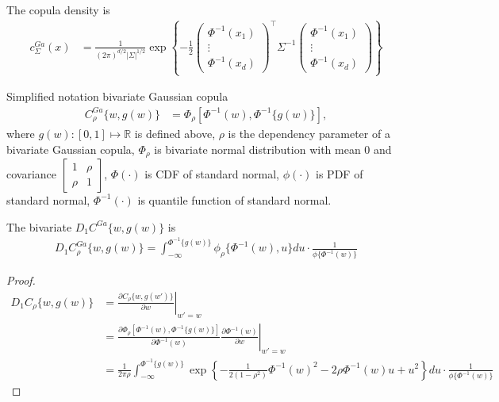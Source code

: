 The copula density is
\begin{align}
    c^{Ga}_\Sigma(x) &= \frac{1}{(2\pi)^{d/2} |\Sigma|^{1/2}}
    \exp \left\{
    -\frac{1}{2}\begin{pmatrix} \Phi^{-1}(x_1) \\ \vdots \\ \Phi^{-1}(x_d) \end{pmatrix}^\top \Sigma^{-1} \begin{pmatrix} \Phi^{-1}(x_1) \\ \vdots \\ \Phi^{-1}(x_d) \end{pmatrix}
    \right\}
    \end{align}

Simplified notation bivariate Gaussian copula
\begin{align}
       C^{Ga}_\rho \{w, g(w)\} &= \Phi_\rho [\Phi^{-1}(w), \Phi^{-1}\{g(w)\}],
\end{align}
where $g(w): [0,1] \mapsto \mathbb{R}$ is defined above,
$\rho$ is the dependency parameter of a bivariate Gaussian copula,
$\Phi_\rho$ is bivariate normal distribution with mean 0 and covariance $\begin{bmatrix}1 & \rho \\ \rho & 1 \end{bmatrix}$,
$\Phi(\cdot)$ is CDF of standard normal,
$\phi(\cdot)$ is PDF of standard normal,
$\Phi^{-1}(\cdot)$ is quantile function of standard normal.


The bivariate $D_1 C^{Ga}\{w, g(w)\}$ is
\begin{align}
    D_1 C^{Ga}_\rho\{w, g(w)\} = \int_{-\infty}^{\Phi^{-1}\{g(w)\}} \phi_\rho\{
    \Phi^{-1}(w), u \}du \cdot \frac{1}{\phi\{\Phi^{-1}(w)\}}
    \end{align}
\begin{proof}
    \begin{align}
    D_1 C_\rho\{w, g(w)\}
    &= \left. \frac{\partial C_\rho\{w, g(w')\}}{\partial w}\right|_{w'=w}\\
    &= \left. \frac{\partial \Phi_\rho [\Phi^{-1}(w), \Phi^{-1}\{g(w)\}]}{\partial \Phi^{-1}(w)} \frac{\partial \Phi^{-1}(w)}{\partial w}\right|_{w'=w}\\
    &= \frac{1}{2\pi\rho} \int_{-\infty}^{\Phi^{-1}\{g(w)\}} \exp\left\{
        -\frac{1}{2(1-\rho^2)} \Phi^{-1}(w)^2 - 2\rho\Phi^{-1}(w)u + u^2
        \right\}du
        \cdot \frac{1}{\phi\{\Phi^{-1}(w)\}}
        \end{align}
    \end{proof}

